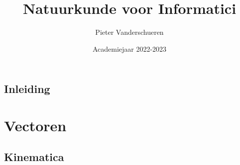 \documentclass{exam}
\title{Natuurkunde voor Informatici}
\author{Pieter Vanderschueren}
\date{Academiejaar 2022-2023}
\newcommand{\RomanNumeralCaps}[1]{\MakeUppercase{\romannumeral #1}}
\begin{document}
\begin{titlingpage}
\maketitle
\end{titlingpage}


\newpage

%
%
%
%
%

\tableofcontents

\newpage

\vspace*{\fill}
\begin{center}
    
\section*{Inleiding}
\end{center}

\vspace*{\fill}

\newpage

\section{Vectoren}

\vspace{0.5cm}



\newpage

\vspace*{\fill}
\begin{center}
    
\section*{Kinematica}
\end{center}
\end{document}
